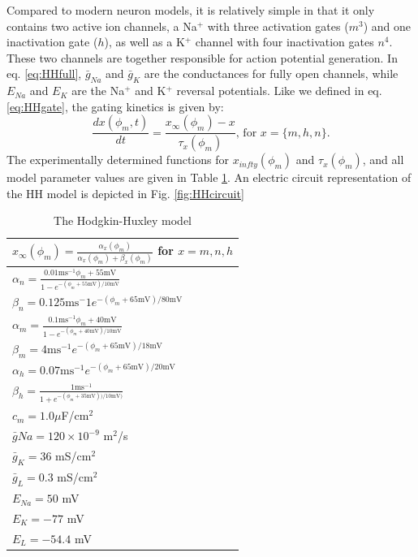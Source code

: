 Compared to modern neuron models, it is relatively simple in that it only contains two active ion channels, a Na$^+$ with three activation gates ($m^3$) and one inactivation gate ($h$), as well as a K$^+$ channel with four inactivation gates $n^4$. These two channels are together responsible for action potential generation. In eq. \ref{eq:HHfull}, $\bar{g}_{Na}$ and $\bar{g}_K$ are the conductances for fully open channels, while $E_{Na}$ and $E_{K}$ are the Na$^+$ and K$^+$ reversal potentials. Like we defined in eq. \ref{eq:HHgate}, the gating kinetics is given by: 
\begin{equation}
\frac{dx(\phi_m,t)}{dt} = \frac{x_{\infty}(\phi_m) - x}{\tau_x(\phi_m)},  \, \text{for } x = \{m,h,n\}.
\label{eq:HHgates}
\end{equation}
The experimentally determined functions for $x_{infty}(\phi_m)$ and $\tau_x(\phi_m)$, and all model parameter values are given in Table \ref{tab:HH}. An electric circuit representation of the HH model is depicted in Fig. \ref{fig:HHcircuit}

\begin{table}[h!]
\begin{center}
\caption{The Hodgkin-Huxley model}
\label{tab:HH}
    \begin{tabular}{l}
    \hline
    $x_{\infty}(\phi_m) = \frac{\alpha_x(\phi_m)}{\alpha_x(\phi_m) + \beta_x(\phi_m)}$ for $x = m,n,h$ \\ \hline
    $ \alpha_n = \frac{0.01 \mathrm{ms}^{-1} \phi_m+55 \mathrm{mV}}{1-e^{-(\phi_m+55 \mathrm{mV})/10 \mathrm{mV}}}$  \\ \hline
    $ \beta_n = 0.125 \mathrm{ms}^-1 e^{-(\phi_m+65 \mathrm{mV})/80 \mathrm{mV}} $  \\ \hline
    $ \alpha_m = \frac{0.1 \mathrm{ms}^{-1} \phi_m+ 40 \mathrm{mV}} {1-e^{-(\phi_m+40 \mathrm{mV})/10 \mathrm{mV}}}$  \\ \hline
    $\beta_m = 4 \mathrm{ms}^{-1} e^{-(\phi_m+65  \mathrm{mV})/18 \mathrm{mV}} $  \\ \hline
    $\alpha_h = 0.07 \mathrm{ms}^{-1} e^{-(\phi_m+65 \mathrm{mV})/20 \mathrm{mV}}$  \\ \hline
    $\beta_h = \frac{1 \mathrm{ms}^{-1}}{1+e^{-(\phi_m+35 \mathrm{mV}))/10 \mathrm{mV})}} $  \\ \hline
    $c_m = 1.0 \mu $F/cm$^2$ \\ \hline
    $\bar{g}{Na} = 120\times 10^{-9}$ m$^2$/s\\ \hline
    $\bar{g}_{K} = 36$ mS/cm$^2$ \\ \hline
    $\bar{g}_{L} = 0.3$ mS/cm$^2$ \\ \hline
    $E_{Na} = 50$ mV \\ \hline
    $E_{K} = -77$ mV \\ \hline
    $E_{L} = -54.4$ mV \\ \hline
    \end{tabular}
\end{center}
\end{table}

